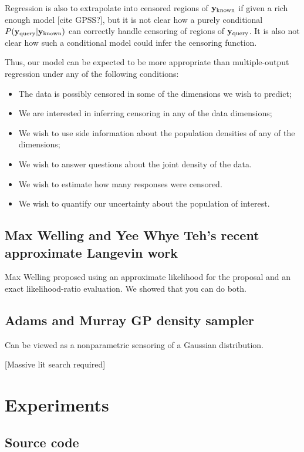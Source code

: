 \documentclass{article}
\begin{document}
Regression is also to extrapolate into censored regions of ${\bf{y}}_{\textrm{known}}$ if given a rich enough model [cite GPSS?], but it is not clear how a purely conditional $P( {\bf{y}}_{\textrm{query}} | {\bf{y}}_{\textrm{known}})$ can correctly handle censoring of regions of ${\bf{y}}_{\textrm{query}}$.  It is also not clear how such a conditional model could infer the censoring function.

Thus, our model can be expected to be more appropriate than multiple-output regression under any of the following conditions:
\begin{itemize}
	\item The data is possibly censored in some of the dimensions we wish to predict;
	\item We are interested in inferring censoring in any of the data dimensions;
	\item We wish to use side information about the population densities of any of the dimensions;
	\item We wish to answer questions about the joint density of the data.
	\item We wish to estimate how many responses were censored.
	\item We wish to quantify our uncertainty about the population of interest.
\end{itemize}

\subsection{Max Welling and Yee Whye Teh's recent approximate Langevin work}

Max Welling proposed using an approximate likelihood for the proposal and an exact likelihood-ratio evaluation.  We showed that you can do both.

\subsection{ Adams and Murray GP density sampler }

Can be viewed as a nonparametric sensoring of a Gaussian distribution.

[Massive lit search required]


\section{Experiments}

\subsection{Source code}
\end{document}
